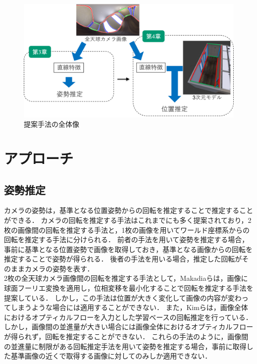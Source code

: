 \begin{figure}[b]
 \begin{center}
 \includegraphics[width=0.9\columnwidth]{./chap2/fig/flow2.png}
 \vspace{5mm}
 \caption{提案手法の全体像}
 \label{fig:flow2}
 \end{center}
\end{figure}


\clearpage
\section{アプローチ}

\subsection{姿勢推定}

カメラの姿勢は，基準となる位置姿勢からの回転を推定することで推定することができる．
カメラの回転を推定する手法はこれまでにも多く提案されており，2枚の画像間の回転を推定する手法と，1枚の画像を用いてワールド座標系からの回転を推定する手法に分けられる．
前者の手法を用いて姿勢を推定する場合，事前に基準となる位置姿勢で画像を取得しておき，基準となる画像からの回転を推定することで姿勢が得られる．
後者の手法を用いる場合，推定した回転がそのままカメラの姿勢を表す．
\\

2枚の全天球カメラ画像間の回転を推定する手法として，Makadiaらは，画像に球面フーリエ変換を適用し，位相変移を最小化することで回転を推定する手法を提案している\mbox{\cite{Makadia2003}}\mbox{\cite{Makadia2004}}\mbox{\cite{Makadia2006}}．
しかし，この手法は位置が大きく変化して画像の内容が変わってしまうような場合には適用することができない．
また，Kimらは，画像全体におけるオプティカルフローを入力とした学習ベースの回転推定を行っている\mbox{\cite{Kim2019}}．
しかし，画像間の並進量が大きい場合には画像全体におけるオプティカルフローが得られず，回転を推定することができない．
これらの手法のように，画像間の並進量に制限がある回転推定手法を用いて姿勢を推定する場合，事前に取得した基準画像の近くで取得する画像に対してのみしか適用できない．
\\

